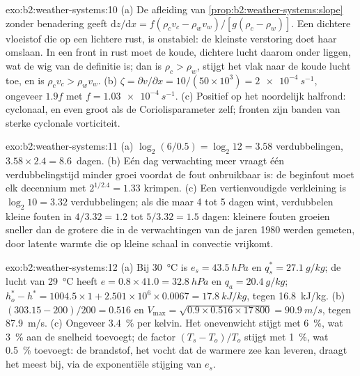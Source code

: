 \begin{solution}{exo:b2:weather-systems:10}
(a) De afleiding van \cref{prop:b2:weather-systems:slope} zonder benadering geeft
$\mathrm{d}z/\mathrm{d}x = f(\rho_c v_c - \rho_w v_w)/[g(\rho_c - \rho_w)]$. Een dichtere vloeistof
die op een lichtere rust, is onstabiel: de kleinste verstoring doet haar omslaan. In een front in
rust moet de koude, dichtere lucht daarom onder liggen, wat de wig van de definitie is; dan is
$\rho_c > \rho_w$, stijgt het vlak naar de koude lucht toe, en is $\rho_c v_c > \rho_w v_w$.
(b) $\zeta = \partial v/\partial x = 10/(50 \times 10^3) = \qty{2e-4}{s^{-1}}$, ongeveer $1.9f$ met
$f = \qty{1.03e-4}{s^{-1}}$. (c) Positief op het noordelijk halfrond: cyclonaal, en even groot als
de Coriolisparameter zelf; fronten zijn banden van sterke cyclonale vorticiteit.
\end{solution}

\begin{solution}{exo:b2:weather-systems:11}
(a) $\log_2(6/0.5) = \log_2 12 = 3.58$ verdubbelingen, $3.58 \times 2.4 = 8.6$~dagen. (b) Eén
dag verwachting meer vraagt één verdubbelingstijd minder groei voordat de fout onbruikbaar is: de
beginfout moet elk decennium met $2^{1/2.4} = 1.33$ krimpen. (c) Een vertienvoudigde verkleining is
$\log_2 10 = 3.32$ verdubbelingen; als die maar 4 tot 5 dagen wint, verdubbelen kleine fouten in $4/3.32 = 1.2$
tot $5/3.32 = 1.5$ dagen: kleinere fouten groeien sneller dan de grotere die in de
verwachtingen van de jaren 1980 werden gemeten, door latente warmte die op kleine schaal in convectie vrijkomt.
\end{solution}

\begin{solution}{exo:b2:weather-systems:12}
(a) Bij \qty{30}{\celsius} is $e_s = \qty{43.5}{hPa}$ en $q_s^* = \qty{27.1}{g/kg}$; de lucht van
\qty{29}{\celsius} heeft $e = 0.8 \times 41.0 = \qty{32.8}{hPa}$ en $q_a = \qty{20.4}{g/kg}$;
$h_o^* - h^* = 1004.5 \times 1 + 2.501 \times 10^6 \times 0.0067 = \qty{17.8}{kJ/kg}$, tegen
\qty{16.8}{kJ/kg}. (b) $(303.15 - 200)/200 = 0.516$ en $V_{\max} = \sqrt{0.9 \times 0.516
\times 17\,800} = \qty{90.9}{m/s}$, tegen \qty{87.9}{m/s}. (c) Ongeveer \qty{3.4}{\percent} per
kelvin. Het onevenwicht stijgt met \qty{6}{\percent}, wat \qty{3}{\percent} aan de snelheid toevoegt;
de factor $(T_s - T_o)/T_o$ stijgt met \qty{1}{\percent}, wat \qty{0.5}{\percent} toevoegt: de
brandstof, het vocht dat de warmere zee kan leveren, draagt het meest bij, via de exponentiële stijging van
$e_s$.
\end{solution}

